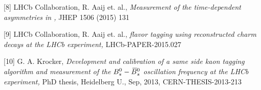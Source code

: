 {\begin{minipage}{0.474\boxwidth}
\begin{compactitem}
\end{compactitem}
\begin{compactitem}
{\tiny\item[{[8]}] LHCb Collaboration, R. Aaij et. al., {\it Measurement of the time-dependent \CP asymmetries in \BsToJPsiKS, } JHEP 1506 (2015) 131}
\end{compactitem}
\begin{compactitem}
{\tiny\item[{[9]}] LHCb Collaboration, R. Aaij et. al., {\it \B flavor tagging using reconstructed charm decays at the LHCb experiment, } LHCb-PAPER-2015.027}
\end{compactitem}
\begin{compactitem}
{\tiny\item[{[10]}] G. A. Krocker, {\it Development and calibration of a same side kaon tagging algorithm and measurement of the $B^0_s-\kern 0.18em\overline{\kern -0.18em B}{}^0_s$ oscillation frequency \dms at the LHCb experiment, } PhD thesis, Heidelberg U., Sep, 2013, CERN-THESIS-2013-213}
\end{compactitem}
\vspace{0.10em}
\end{minipage}

}
